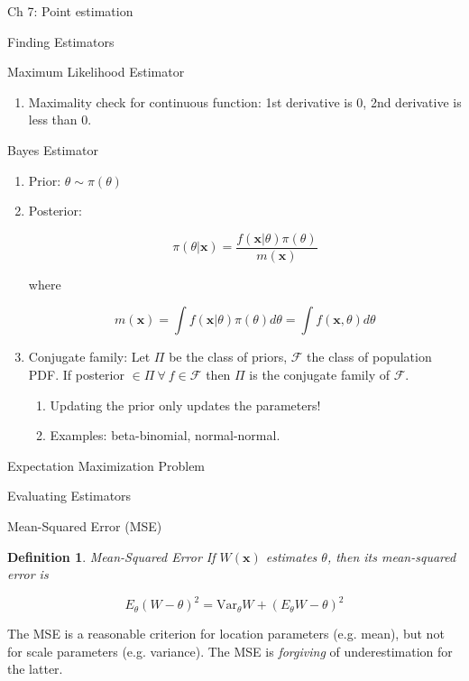 \documentclass{article}
\newcommand{\Var}{\mathrm{Var}}
\newcommand{\bo}[1]{\boldsymbol{#1}}
\newtheorem{definition}{Definition}
\begin{document}
\begin{section}{Ch 7: Point estimation}
\begin{subsection}{Finding Estimators}
\begin{subsubsection}{Maximum Likelihood Estimator}
\begin{enumerate}
\item Maximality check for continuous function: 1st derivative is 0, 2nd
derivative is less than 0.
\end{enumerate}
\end{subsubsection}

\begin{subsubsection}{Bayes Estimator}
\begin{enumerate}
\item Prior: $\theta \sim \pi(\theta)$
\item Posterior: 

\[ \pi(\theta | \bo{x}) = \frac{f(\bo{x}|\theta) \pi(\theta)}{m(\bo{x})} \]

\noindent where

\[ m(\bo{x}) = \int f(\bo{x}|\theta) \pi(\theta) d\theta = 
               \int f(\bo{x}, \theta) d\theta \]

\item Conjugate family: Let $\Pi$ be the class of priors, $\mathcal{F}$ the
class of population PDF. If posterior $\in \Pi \ \forall \  f \in \mathcal{F}$ 
then $\Pi$ is the conjugate family of $\mathcal{F}$.
  \begin{enumerate}
  \item Updating the prior only updates the parameters!
  \item Examples: beta-binomial, normal-normal.
  \end{enumerate}
\end{enumerate}
\end{subsubsection}

\begin{subsubsection}{Expectation Maximization Problem}
\end{subsubsection}
\end{subsection}

\begin{subsection}{Evaluating Estimators}
\begin{subsubsection}{Mean-Squared Error (MSE)}
\begin{definition}{Mean-Squared Error}
If $W(\bo{x})$ estimates $\theta$, then its mean-squared error is 

\[E_{\theta}(W - \theta)^2 = \Var_{\theta} W + (E_{\theta}W - \theta)^2\]
\end{definition}

The MSE is a reasonable criterion for location parameters (e.g. mean), but
not for scale parameters (e.g. variance). The MSE is \emph{forgiving} of
underestimation for the latter.


\end{subsubsection}
\end{subsection}
\end{section}
\end{document}
